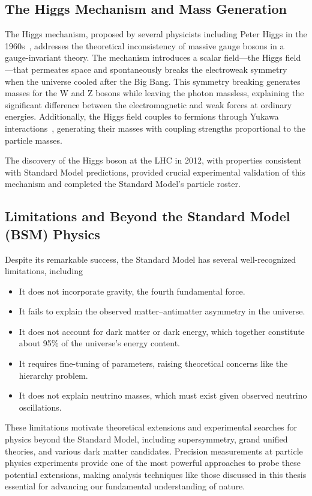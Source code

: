 \subsection{The Higgs Mechanism and Mass Generation}
The Higgs mechanism, proposed by several physicists including Peter Higgs in the 1960s~\cite{PhysRevLett.13.508}, addresses the theoretical inconsistency of massive gauge bosons in a gauge-invariant theory.
%
The mechanism introduces a scalar field---the Higgs field---that permeates space and spontaneously breaks the electroweak symmetry when the universe cooled after the Big Bang.
%
This symmetry breaking generates masses for the W and Z bosons while leaving the photon massless, explaining the significant difference between the electromagnetic and weak forces at ordinary energies. Additionally, the Higgs field couples to fermions through Yukawa interactions~\cite{DHoker1984DecouplingTheory}, generating their masses with coupling strengths proportional to the particle masses.

The discovery of the Higgs boson at the LHC in 2012, with properties consistent with Standard Model predictions, provided crucial experimental validation of this mechanism and completed the Standard Model's particle roster.

\subsection{Limitations and Beyond the Standard Model (BSM) Physics}
Despite its remarkable success, the Standard Model has several well-recognized limitations, including

    \begin{itemize}
        \item It does not incorporate gravity, the fourth fundamental force.
        \item It fails to explain the observed matter--antimatter asymmetry in the universe.
        \item It does not account for dark matter or dark energy, which together constitute about 95\% of the universe's energy content.
        \item  It requires fine-tuning of parameters, raising theoretical concerns like the hierarchy problem.
        \item  It does not explain neutrino masses, which must exist given observed neutrino oscillations.
    \end{itemize}
These limitations motivate theoretical extensions and experimental searches for physics beyond the Standard Model, including supersymmetry, grand unified theories, and various dark matter candidates.
%
Precision measurements at particle physics experiments provide one of the most powerful approaches to probe these potential extensions, making analysis techniques like those discussed in this thesis essential for advancing our fundamental understanding of nature.

